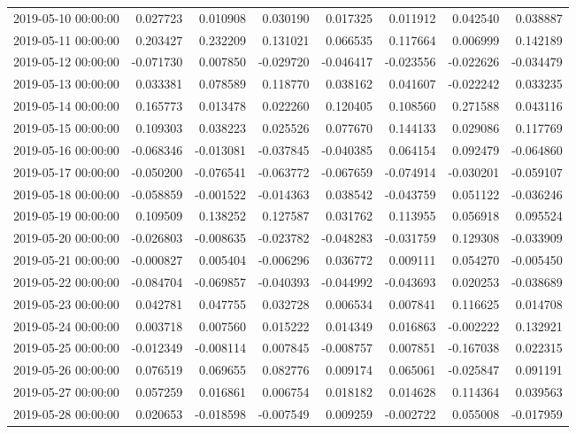 \begin{tabular}{lrrrrrrr}
2019-05-10 00:00:00 & 0.027723 & 0.010908 & 0.030190 & 0.017325 & 0.011912 & 0.042540 & 0.038887 \\
2019-05-11 00:00:00 & 0.203427 & 0.232209 & 0.131021 & 0.066535 & 0.117664 & 0.006999 & 0.142189 \\
2019-05-12 00:00:00 & -0.071730 & 0.007850 & -0.029720 & -0.046417 & -0.023556 & -0.022626 & -0.034479 \\
2019-05-13 00:00:00 & 0.033381 & 0.078589 & 0.118770 & 0.038162 & 0.041607 & -0.022242 & 0.033235 \\
2019-05-14 00:00:00 & 0.165773 & 0.013478 & 0.022260 & 0.120405 & 0.108560 & 0.271588 & 0.043116 \\
2019-05-15 00:00:00 & 0.109303 & 0.038223 & 0.025526 & 0.077670 & 0.144133 & 0.029086 & 0.117769 \\
2019-05-16 00:00:00 & -0.068346 & -0.013081 & -0.037845 & -0.040385 & 0.064154 & 0.092479 & -0.064860 \\
2019-05-17 00:00:00 & -0.050200 & -0.076541 & -0.063772 & -0.067659 & -0.074914 & -0.030201 & -0.059107 \\
2019-05-18 00:00:00 & -0.058859 & -0.001522 & -0.014363 & 0.038542 & -0.043759 & 0.051122 & -0.036246 \\
2019-05-19 00:00:00 & 0.109509 & 0.138252 & 0.127587 & 0.031762 & 0.113955 & 0.056918 & 0.095524 \\
2019-05-20 00:00:00 & -0.026803 & -0.008635 & -0.023782 & -0.048283 & -0.031759 & 0.129308 & -0.033909 \\
2019-05-21 00:00:00 & -0.000827 & 0.005404 & -0.006296 & 0.036772 & 0.009111 & 0.054270 & -0.005450 \\
2019-05-22 00:00:00 & -0.084704 & -0.069857 & -0.040393 & -0.044992 & -0.043693 & 0.020253 & -0.038689 \\
2019-05-23 00:00:00 & 0.042781 & 0.047755 & 0.032728 & 0.006534 & 0.007841 & 0.116625 & 0.014708 \\
2019-05-24 00:00:00 & 0.003718 & 0.007560 & 0.015222 & 0.014349 & 0.016863 & -0.002222 & 0.132921 \\
2019-05-25 00:00:00 & -0.012349 & -0.008114 & 0.007845 & -0.008757 & 0.007851 & -0.167038 & 0.022315 \\
2019-05-26 00:00:00 & 0.076519 & 0.069655 & 0.082776 & 0.009174 & 0.065061 & -0.025847 & 0.091191 \\
2019-05-27 00:00:00 & 0.057259 & 0.016861 & 0.006754 & 0.018182 & 0.014628 & 0.114364 & 0.039563 \\
2019-05-28 00:00:00 & 0.020653 & -0.018598 & -0.007549 & 0.009259 & -0.002722 & 0.055008 & -0.017959 \\

\end{tabular}
